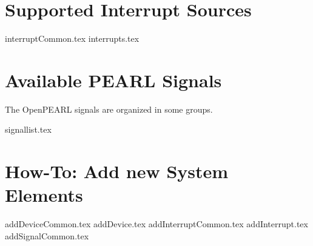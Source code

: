 \documentclass[oneside,10pt]{scrbook}
\begin{document}
\chapter{Supported Interrupt Sources}
{interruptCommon.tex}
{interrupts.tex}

\chapter{Available PEARL Signals}
The OpenPEARL signals are organized in some groups.

{signallist.tex}


\chapter{How-To: Add new System Elements}
{addDeviceCommon.tex}
{addDevice.tex}
{addInterruptCommon.tex}
{addInterrupt.tex}
{addSignalCommon.tex}
\end{document}
